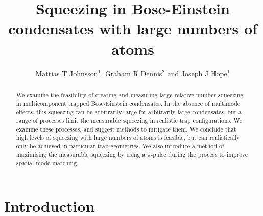 \documentclass{iopart}
\begin{document}
\title{Squeezing in Bose-Einstein condensates with large numbers of atoms}

\author{Mattias T Johnsson$^1$, Graham R Dennis$^2$ and Joseph J Hope$^1$}

\address{$^1$Department of Quantum Science, Research School of Physics and Engineering, The Australian National University, Canberra ACT 0200, Australia}
\address{$^2$Plasma Research Laboratory, Research School of Physics and Engineering, The Australian National University, Canberra ACT 0200, Australia}

\begin{abstract}
We examine the feasibility of creating and measuring large relative number squeezing in multicomponent trapped Bose-Einstein condensates.  In the absence of multimode effects, this squeezing can be arbitrarily large for arbitrarily large condensates, but a range of processes limit the measurable squeezing in realistic trap configurations.  We examine these processes, and suggest methods to mitigate them. We conclude that high levels of squeezing with large numbers of atoms is feasible, but can realistically only be achieved in particular trap geometries.  We also introduce a method of maximising the measurable squeezing by using a $\pi$-pulse during the process to improve spatial mode-matching.
\end{abstract}

\maketitle

\section{Introduction}
\label{sectionIntroduction}
\end{document}
